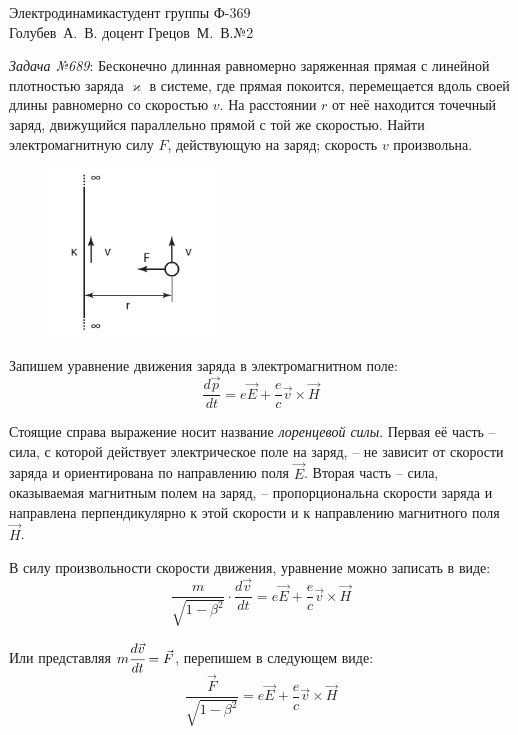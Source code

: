 




{Электродинамика}{студент группы Ф-369\\Голубев~А.~В.}
{доцент Грецов~М.~В.}{№2}

\newcommand{\grad}{\mathrm{grad}\,}

\newpage
\emph{Задача №689}: Бесконечно длинная равномерно заряженная прямая с линейной
плотностью заряда \( \varkappa \) в системе, где прямая покоится, перемещается
вдоль своей длины равномерно со скоростью \( v \). На расстоянии \( r \) от неё
находится точечный заряд, движущийся параллельно прямой с той же скоростью. 
Найти электромагнитную силу \( F \), действующую на заряд; скорость \( v \)
произвольна.
\begin{figure}[ht]
    \center
	\includegraphics[width=0.4\textwidth]{pdf/01.pdf}
\end{figure}

Запишем уравнение движения заряда в электромагнитном поле:
\[ \frac{d\vec{p}}{dt} = e\vec{E} + \frac{e}{c}\vec{v}\times\vec{H} \]

Стоящие справа выражение носит название \emph{лоренцевой силы}. Первая её 
часть -- сила, с которой действует электрическое поле на заряд, -- не зависит 
от скорости заряда и ориентирована по направлению поля \( \vec{E} \). Вторая 
часть -- сила, оказываемая магнитным полем на заряд, -- пропорциональна скорости 
заряда и направлена перпендикулярно к этой скорости и к направлению магнитного 
поля \( \vec{H} \).

В силу произвольности скорости движения, уравнение можно записать в виде:
\[ 
	\frac{m}{\sqrt{1-\beta^2}}\cdot\frac{d\vec{v}}{dt} = 
	e\vec{E} + \frac{e}{c}\vec{v}\times\vec{H} 
\]

Или представляя \( m\cfrac{d\vec{v}}{dt} = \vec{F} \), перепишем в следующем виде:
\[ \frac{\vec{F}}{\sqrt{1-\beta^2}} = e\vec{E} + \frac{e}{c}\vec{v}\times\vec{H} \]

